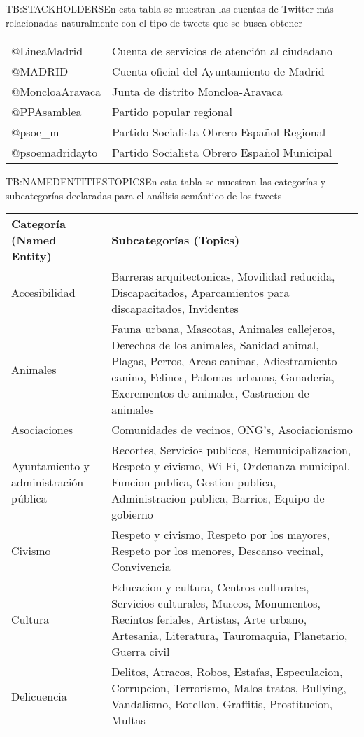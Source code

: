 \begin{table}[Stackholders utilizados para las extracciones]{TB:STACKHOLDERS}{En esta tabla se muestran las cuentas de Twitter más relacionadas naturalmente con el tipo de tweets que se busca obtener}
\begin{tabular}{|p{4cm}|p{8cm}|}
			@LineaMadrid & Cuenta de servicios de atención al ciudadano\\
			@MADRID & Cuenta oficial del Ayuntamiento de Madrid\\
			@MoncloaAravaca & Junta de distrito Moncloa-Aravaca\\
			@PPAsamblea & Partido popular regional\\
			@psoe\_m & Partido Socialista Obrero Español Regional\\
			@psoemadridayto & Partido Socialista Obrero Español Municipal\\
			\hline \hline
			\hline
		\end{tabular}
\end{table}

\begin{table}[Relación de categorías y subcategorías para análisis semántico]{TB:NAMEDENTITIESTOPICS}{En esta tabla se muestran las categorías y subcategorías declaradas para el análisis semántico de los tweets}
	\begin{tabular}{|p{5cm}|p{12.5cm}|}
		\hline
		\textbf{Categoría (Named Entity)} & \textbf{Subcategorías (Topics)} \\
		Accesibilidad &  Barreras arquitectonicas, Movilidad reducida, Discapacitados, Aparcamientos para discapacitados, Invidentes \\
		Animales &  Fauna urbana, Mascotas, Animales callejeros, Derechos de los animales, Sanidad animal, Plagas, Perros, Areas caninas, Adiestramiento canino, Felinos, Palomas urbanas, Ganaderia, Excrementos de animales, Castracion de animales \\
		Asociaciones &  Comunidades de vecinos, ONG's, Asociacionismo \\
		Ayuntamiento y administración pública &  Recortes, Servicios publicos, Remunicipalizacion, Respeto y civismo, Wi-Fi, Ordenanza municipal, Funcion publica, Gestion publica, Administracion publica, Barrios, Equipo de gobierno \\
		Civismo &  Respeto y civismo, Respeto por los mayores, Respeto por los menores, Descanso vecinal, Convivencia \\
		Cultura &  Educacion y cultura, Centros culturales, Servicios culturales, Museos, Monumentos, Recintos feriales, Artistas, Arte urbano, Artesania, Literatura, Tauromaquia, Planetario, Guerra civil \\
		Delicuencia &  Delitos, Atracos, Robos, Estafas, Especulacion, Corrupcion, Terrorismo, Malos tratos, Bullying, Vandalismo, Botellon, Graffitis, Prostitucion, Multas \\

\end{tabular}
\end{table}
